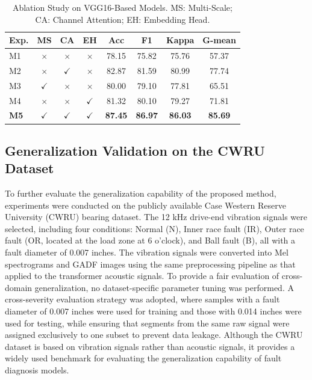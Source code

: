 \documentclass[journal]{IEEEtran}
\begin{document}
\begin{table}
	\centering
	\caption{Ablation Study on VGG16-Based Models. MS: Multi-Scale; CA: Channel Attention; EH: Embedding Head.}
	\label{tab:ablation_vgg16}
	\renewcommand{\arraystretch}{1.2}
	\small
		\begin{tabular}{lccccccc}
			\hline
			\textbf{Exp.} & \textbf{MS} & \textbf{CA} & \textbf{EH} & \textbf{Acc} & \textbf{F1} & \textbf{Kappa} & \textbf{G-mean} \\
			\hline
			M1 & $\times$ & $\times$ & $\times$ & 78.15 & 75.82 & 75.76 & 57.37 \\
			M2 & $\times$ & $\checkmark$ & $\times$ & 82.87 & 81.59 & 80.99 & 77.74 \\
			M3 & $\checkmark$ &$\times$ & $\times$ & 80.00 & 79.10 & 77.81 & 65.51 \\
			M4 & $\times$ & $\times$ & $\checkmark$ & 81.32 & 80.10 & 79.27 & 71.81 \\
			\textbf{M5} & $\checkmark$ & $\checkmark$ & $\checkmark$ & \textbf{87.45} & \textbf{86.97} & \textbf{86.03} & \textbf{85.69} \\
			\hline
		\end{tabular}
\end{table}



\subsection{Generalization Validation on the CWRU Dataset}
To further evaluate the generalization capability of the proposed method, experiments were conducted on the publicly available Case Western Reserve University (CWRU) bearing dataset. The 12 kHz drive-end vibration signals were selected, including four conditions: Normal (N), Inner race fault (IR), Outer race fault (OR, located at the load zone at 6 o’clock), and Ball fault (B), all with a fault diameter of 0.007 inches. The vibration signals were converted into Mel spectrograms and GADF images using the same preprocessing pipeline as that applied to the transformer acoustic signals. To provide a fair evaluation of cross-domain generalization, no dataset-specific parameter tuning was performed. A cross-severity evaluation strategy was adopted, where samples with a fault diameter of 0.007 inches were used for training and those with 0.014 inches were used for testing, while ensuring that segments from the same raw signal were assigned exclusively to one subset to prevent data leakage. Although the CWRU dataset is based on vibration signals rather than acoustic signals, it provides a widely used benchmark for evaluating the generalization capability of fault diagnosis models.
\end{document}
